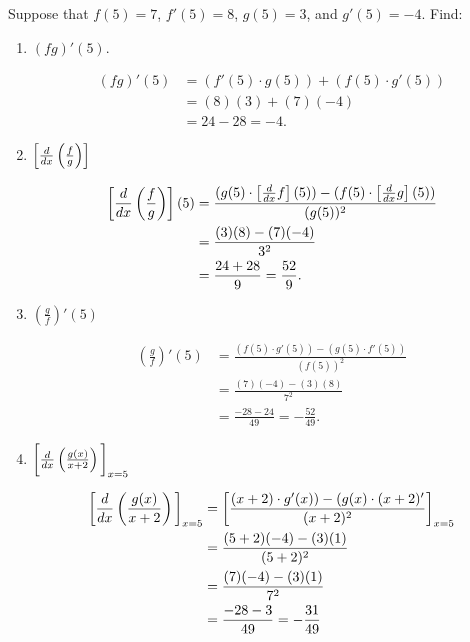 \documentclass[nooutcomes,handout]{ximera}
\begin{document}
\begin{problem}
Suppose that $f(5) = 7$, $f'(5) = 8$, $g(5) = 3$, and $g'(5) = -4$.  Find:

	\begin{enumerate}

	\item  $(fg)'(5)$.
		\begin{freeResponse}
		\begin{align*}
		(fg)'(5) &= (f'(5) \cdot g(5)) + (f(5) \cdot g'(5))  \\
		&= (8)(3) + (7)(-4)  \\
		&= 24 - 28 = -4.
		\end{align*}
		\end{freeResponse}
		
		

	\item $\left[ \frac{d}{dx} \left( \frac{f}{g} \right) \right]$
		\begin{freeResponse}
		\begin{align*}
		\left[ \frac{d}{dx} \left( \frac{f}{g} \right) \right] (5) &= \frac{(g(5) \cdot \left[ \frac{d}{dx} f \right] (5)) - (f(5) \cdot \left[ \frac{d}{dx} g \right](5))}{(g(5))^2}  \\
		&= \frac{(3)(8) - (7)(-4)}{3^2}  \\
		&= \frac{24 + 28}{9} = \frac{52}{9}.
		\end{align*}
		\end{freeResponse}
		
		
	\item $ \left( \frac{g}{f} \right)' (5)$
		\begin{freeResponse}
		\begin{align*}
		\left( \frac{g}{f} \right)' (5) &= \frac{(f(5) \cdot g'(5)) - (g(5) \cdot f'(5))}{(f(5))^2}  \\
		&= \frac{(7)(-4) - (3)(8)}{7^2}  \\
		&= \frac{-28 - 24}{49} = - \frac{52}{49}.
		\end{align*}
		\end{freeResponse}
		
	\item  $\bigg[  \frac{d}{dx} \left( \frac{g(x)}{x+2} \right) \bigg]_{x=5}$
		\begin{freeResponse}
		\begin{align*}
		\bigg[ \frac{d}{dx} \left( \frac{g(x)}{x+2} \right) \bigg]_{x=5} &= \bigg[ \frac{(x+2) \cdot g'(x)) - (g(x) \cdot (x+2)'}{(x+2)^2} \bigg]_{x=5}  \\
		&= \frac{(5+2)(-4) - (3)(1)}{(5+2)^2}  \\
		&= \frac{(7)(-4) - (3)(1)}{7^2}  \\
		&= \frac{-28 - 3}{49} = - \frac{31}{49}
		\end{align*}
		\end{freeResponse}




\end{enumerate}
\end{problem}
\end{document}
